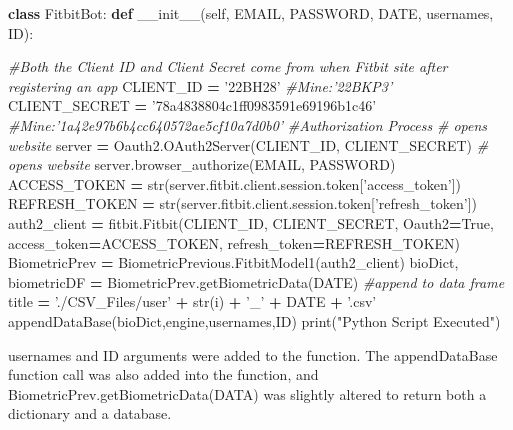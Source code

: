 \documentclass[]{book}
\newenvironment{Shaded}{\begin{snugshade}}{\end{snugshade}}
\newcommand{\BuiltInTok}[1]{#1}
\newcommand{\CommentTok}[1]{\textcolor[rgb]{0.56,0.35,0.01}{\textit{#1}}}
\newcommand{\FunctionTok}[1]{\textcolor[rgb]{0.00,0.00,0.00}{#1}}
\newcommand{\KeywordTok}[1]{\textcolor[rgb]{0.13,0.29,0.53}{\textbf{#1}}}
\newcommand{\NormalTok}[1]{#1}
\newcommand{\OperatorTok}[1]{\textcolor[rgb]{0.81,0.36,0.00}{\textbf{#1}}}
\newcommand{\StringTok}[1]{\textcolor[rgb]{0.31,0.60,0.02}{#1}}
\newcommand{\VariableTok}[1]{\textcolor[rgb]{0.00,0.00,0.00}{#1}}
\begin{document}
\begin{Shaded}
\begin{Highlighting}[]
\KeywordTok{class}\NormalTok{ FitbitBot:}
    \KeywordTok{def} \FunctionTok{__init__}\NormalTok{(}\VariableTok{self}\NormalTok{, EMAIL, PASSWORD, DATE, usernames, ID):}
 
        \CommentTok{#Both the Client ID and Client Secret come from when Fitbit site after registering an app}
\NormalTok{        CLIENT_ID }\OperatorTok{=} \StringTok{'22BH28'} \CommentTok{#Mine:'22BKP3'}
\NormalTok{        CLIENT_SECRET }\OperatorTok{=} \StringTok{'78a4838804c1ff0983591e69196b1c46'} \CommentTok{#Mine:'1a42e97b6b4cc640572ae5cf10a7d0b0'}
        \CommentTok{#Authorization Process}
        \CommentTok{# opens website}
\NormalTok{        server }\OperatorTok{=}\NormalTok{ Oauth2.OAuth2Server(CLIENT_ID, CLIENT_SECRET)}
        \CommentTok{# opens website}
\NormalTok{        server.browser_authorize(EMAIL, PASSWORD)}
\NormalTok{        ACCESS_TOKEN }\OperatorTok{=} \BuiltInTok{str}\NormalTok{(server.fitbit.client.session.token[}\StringTok{'access_token'}\NormalTok{])}
\NormalTok{        REFRESH_TOKEN }\OperatorTok{=} \BuiltInTok{str}\NormalTok{(server.fitbit.client.session.token[}\StringTok{'refresh_token'}\NormalTok{])}
\NormalTok{        auth2_client }\OperatorTok{=}\NormalTok{ fitbit.Fitbit(CLIENT_ID, CLIENT_SECRET, Oauth2}\OperatorTok{=}\VariableTok{True}\NormalTok{, access_token}\OperatorTok{=}\NormalTok{ACCESS_TOKEN,}
\NormalTok{        refresh_token}\OperatorTok{=}\NormalTok{REFRESH_TOKEN)}
\NormalTok{        BiometricPrev }\OperatorTok{=}\NormalTok{ BiometricPrevious.FitbitModel1(auth2_client)}
\NormalTok{        bioDict, biometricDF }\OperatorTok{=}\NormalTok{ BiometricPrev.getBiometricData(DATE) }\CommentTok{#append to data frame}
\NormalTok{        title }\OperatorTok{=} \StringTok{'./CSV_Files/user'} \OperatorTok{+} \BuiltInTok{str}\NormalTok{(i) }\OperatorTok{+} \StringTok{'_'} \OperatorTok{+}\NormalTok{ DATE }\OperatorTok{+} \StringTok{'.csv'}
\NormalTok{        appendDataBase(bioDict,engine,usernames,ID)}
        \BuiltInTok{print}\NormalTok{(}\StringTok{"Python Script Executed"}\NormalTok{)}
\end{Highlighting}
\end{Shaded}

usernames and ID arguments were added to the function. The appendDataBase function call was also added into the function, and BiometricPrev.getBiometricData(DATA) was slightly altered to return both a dictionary and a database.
\end{document}
